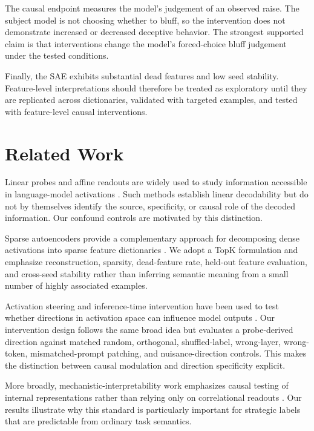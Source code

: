 The causal endpoint measures the model's judgement of an observed raise. The subject model is not choosing whether to bluff, so the intervention does not demonstrate increased or decreased deceptive behavior. The strongest supported claim is that interventions change the model's forced-choice bluff judgement under the tested conditions.

Finally, the SAE exhibits substantial dead features and low seed stability. Feature-level interpretations should therefore be treated as exploratory until they are replicated across dictionaries, validated with targeted examples, and tested with feature-level causal interventions.

\section{Related Work}
Linear probes and affine readouts are widely used to study information accessible in language-model activations \citep{burns2022,belrose2023}. Such methods establish linear decodability but do not by themselves identify the source, specificity, or causal role of the decoded information. Our confound controls are motivated by this distinction.

Sparse autoencoders provide a complementary approach for decomposing dense activations into sparse feature dictionaries \citep{cunningham2023}. We adopt a TopK formulation and emphasize reconstruction, sparsity, dead-feature rate, held-out feature evaluation, and cross-seed stability rather than inferring semantic meaning from a small number of highly associated examples.

Activation steering and inference-time intervention have been used to test whether directions in activation space can influence model outputs \citep{li2023,turner2023}. Our intervention design follows the same broad idea but evaluates a probe-derived direction against matched random, orthogonal, shuffled-label, wrong-layer, wrong-token, mismatched-prompt patching, and nuisance-direction controls. This makes the distinction between causal modulation and direction specificity explicit.

More broadly, mechanistic-interpretability work emphasizes causal testing of internal representations rather than relying only on correlational readouts \citep{elhage2021,geiger2021}. Our results illustrate why this standard is particularly important for strategic labels that are predictable from ordinary task semantics.

